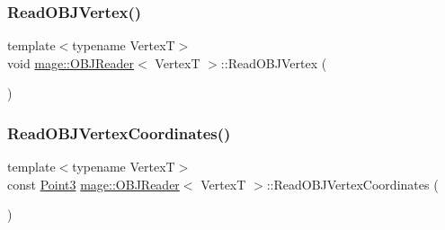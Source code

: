 \hypertarget{classmage_1_1_o_b_j_reader_a70fc61d8cc14dc8efbd73a88188cc511}{}\label{classmage_1_1_o_b_j_reader_a70fc61d8cc14dc8efbd73a88188cc511} 
\subsubsection{\texorpdfstring{Read\+O\+B\+J\+Vertex()}{ReadOBJVertex()}}
{\footnotesize\ttfamily template$<$typename VertexT$>$ \\
void \hyperlink{classmage_1_1_o_b_j_reader}{mage\+::\+O\+B\+J\+Reader}$<$ VertexT $>$\+::Read\+O\+B\+J\+Vertex (\begin{DoxyParamCaption}{ }\end{DoxyParamCaption})\hspace{0.3cm}{\ttfamily [private]}}

\hypertarget{classmage_1_1_o_b_j_reader_ace593a436953e8583b5b4cd721893c44}{}\label{classmage_1_1_o_b_j_reader_ace593a436953e8583b5b4cd721893c44} 
\subsubsection{\texorpdfstring{Read\+O\+B\+J\+Vertex\+Coordinates()}{ReadOBJVertexCoordinates()}}
{\footnotesize\ttfamily template$<$typename VertexT$>$ \\
const \hyperlink{structmage_1_1_point3}{Point3} \hyperlink{classmage_1_1_o_b_j_reader}{mage\+::\+O\+B\+J\+Reader}$<$ VertexT $>$\+::Read\+O\+B\+J\+Vertex\+Coordinates (\begin{DoxyParamCaption}{ }\end{DoxyParamCaption})\hspace{0.3cm}{\ttfamily [private]}}

\hypertarget{classmage_1_1_o_b_j_reader_a2e807f8c18874135888d1e99d4d08d90}{}\label{classmage_1_1_o_b_j_reader_a2e807f8c18874135888d1e99d4d08d90} 
